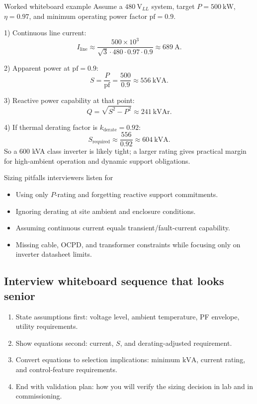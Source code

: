 \documentclass[11pt]{article}
\newcommand{\kW}{\mathrm{kW}}
\newcommand{\kVA}{\mathrm{kVA}}
\begin{document}
\begin{examplebox}{Worked whiteboard example}
Assume a \(480~\mathrm{V}_{LL}\) system, target \(P=500~\kW\),
\(\eta=0.97\), and minimum operating power factor \(\mathrm{pf}=0.9\).

1) Continuous line current:
\[
I_{\mathrm{line}} \approx
\frac{500\times 10^3}{\sqrt{3}\cdot 480 \cdot 0.97 \cdot 0.9}
\approx 689~\mathrm{A}.
\]

2) Apparent power at \(\mathrm{pf}=0.9\):
\[
S = \frac{P}{\mathrm{pf}} = \frac{500}{0.9} \approx 556~\kVA.
\]

3) Reactive power capability at that point:
\[
Q = \sqrt{S^2 - P^2} \approx 241~\mathrm{kVAr}.
\]

4) If thermal derating factor is \(k_{\mathrm{derate}}=0.92\):
\[
S_{\mathrm{required}} \approx \frac{556}{0.92} \approx 604~\kVA.
\]
So a 600 kVA class inverter is likely tight; a larger rating gives practical
margin for high-ambient operation and dynamic support obligations.
\end{examplebox}

\begin{warningbox}{Sizing pitfalls interviewers listen for}
\begin{itemize}
  \item Using only \(P\)-rating and forgetting reactive support commitments.
  \item Ignoring derating at site ambient and enclosure conditions.
  \item Assuming continuous current equals transient/fault-current capability.
  \item Missing cable, OCPD, and transformer constraints while focusing only on inverter datasheet limits.
\end{itemize}
\end{warningbox}

\subsection{Interview whiteboard sequence that looks senior}
\begin{enumerate}
  \item State assumptions first: voltage level, ambient temperature, PF envelope, utility requirements.
  \item Show equations second: current, \(S\), and derating-adjusted requirement.
  \item Convert equations to selection implications: minimum \(\kVA\), current rating, and control-feature requirements.
  \item End with validation plan: how you will verify the sizing decision in lab and in commissioning.
\end{enumerate}
\end{document}
